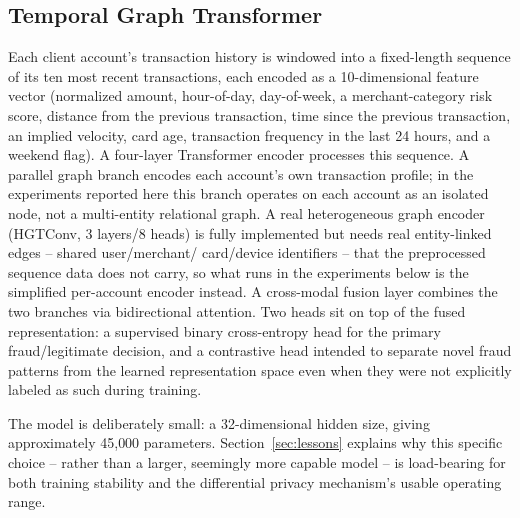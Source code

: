 \documentclass[12pt]{svproc}
\begin{document}
\subsection{Temporal Graph Transformer}
\label{sec:graphbranch}
Each client account's transaction history is windowed into a
fixed-length sequence of its ten most recent transactions, each encoded
as a 10-dimensional feature vector (normalized amount, hour-of-day,
day-of-week, a merchant-category risk score, distance from the
previous transaction, time since the previous transaction, an implied
velocity, card age, transaction frequency in the last 24 hours, and a
weekend flag). A four-layer Transformer encoder processes this
sequence. A parallel graph branch encodes each account's own transaction
profile; in the experiments reported here this branch operates on each
account as an isolated node, not a multi-entity relational graph. A
real heterogeneous graph encoder (HGTConv, 3 layers/8 heads) is fully
implemented but needs real entity-linked edges -- shared user/merchant/
card/device identifiers -- that the preprocessed sequence data does not
carry, so what runs in the experiments below is the simplified
per-account encoder instead. A cross-modal fusion
layer combines the two branches via bidirectional attention. Two heads
sit on top of the fused
representation: a supervised binary cross-entropy head for the primary
fraud/legitimate decision, and a contrastive head intended to separate
novel fraud patterns from the learned representation space even when
they were not explicitly labeled as such during training.

The model is deliberately small: a 32-dimensional hidden size, giving
approximately 45{,}000 parameters. Section~\ref{sec:lessons} explains
why this specific choice -- rather than a larger, seemingly more
capable model -- is load-bearing for both training stability and the
differential privacy mechanism's usable operating range.
\end{document}
